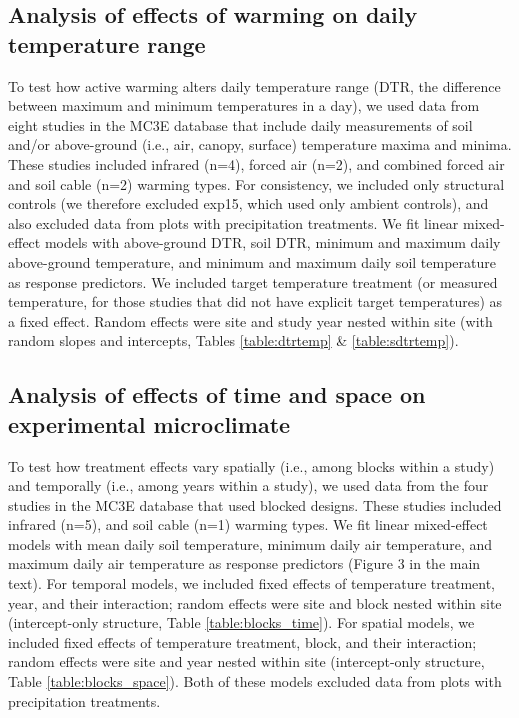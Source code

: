 \documentclass{article}
\begin{document}
\subsection* {Analysis of effects of warming on daily temperature range}
To test how active warming alters daily temperature range (DTR, the difference between maximum and minimum temperatures in a day), we used data from eight studies in the MC3E database that include daily measurements of soil and/or above-ground (i.e., air, canopy, surface) temperature maxima and minima. These studies included infrared (n=4), forced air (n=2), and combined forced air and soil cable (n=2) warming types.  For consistency, we included only structural controls (we therefore excluded exp15, which used only ambient controls), and also excluded data from plots with precipitation treatments. We fit linear mixed-effect models with above-ground DTR, soil DTR, minimum and maximum daily above-ground temperature, and minimum and maximum daily soil temperature as response predictors. We included target temperature treatment (or measured temperature, for those studies that did not have explicit target temperatures) as a fixed effect. Random effects were site and study year nested within site (with random slopes and intercepts, Tables \ref{table:dtrtemp} \& \ref{table:sdtrtemp}). 

\subsection* {Analysis of effects of time and space on experimental microclimate}
To test how treatment effects vary spatially (i.e., among blocks within a study) and temporally (i.e., among years within a study), we used data from the four studies in the MC3E database that used blocked designs. These studies included infrared (n=5), and soil cable (n=1) warming types.  We fit linear mixed-effect models with mean daily soil temperature, minimum daily air temperature, and maximum daily air temperature as response predictors (Figure 3 in the main text). For temporal models, we included fixed effects of temperature treatment, year, and their interaction; random effects were site and block nested within site (intercept-only structure, Table \ref{table:blocks_time}). For spatial models, we included fixed effects of temperature treatment, block, and their interaction; random effects were site and year nested within site (intercept-only structure, Table \ref{table:blocks_space}). Both of these models excluded data from plots with precipitation treatments. 
\end{document}
